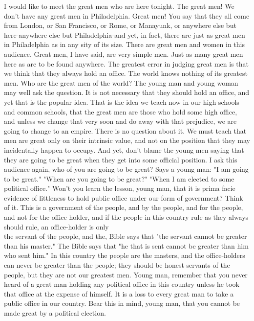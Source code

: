 \documentclass[10pt]{article}
\begin{document}
I would like to meet the great men who are here tonight. The great men! We don't have any great men in Philadelphia. Great men! You say that they all come from London, or San Francisco, or Rome, or Manayunk, or anywhere else but here-anywhere else but Philadelphia-and yet, in fact, there are just as great men in Philadelphia as in any sity of its size. There are great men and women in this audience. Great men, I have said, are very simple men. Just as many great men here as are to be found anywhere. The greatest error in judging great men is that we think that they always hold an office. The world knows nothing of its greatest men. Who are the great men of the world? The young man and young woman may well ask the question. It is not necessary that they should hold an office, and yet that is the popular idea. That is the idea we teach now in our high schools and common schools, that the great men are those who hold some high office, and unless we change that very soon and do away with that prejudice, we are going to change to an empire. There is no question about it. We must teach that men are great only on their intrinsic value, and not on the position that they may incidentally happen to occupy. And yet, don't blame the young men saying that they are going to be great when they get into some official position. I ask this audience again, who of you are going to be great? Says a young man: "I am going to be great." "When are you going to be great?" "When I am elected to some political office." Won't you learn the lesson, young man, that it is prima facie evidence of littleness to hold public office under our form of government? Think of it. This is a government of the people, and by the people, and for the people, and not for the office-holder, and if the people in this country rule as they always should rule, an office-holder is only\\
the servant of the people, and the, Bible says that "the servant cannot be greater than his master." The Bible says that "he that is sent cannot be greater than him who sent him." In this country the people are the masters, and the office-holders can never be greater than the people; they should be honest servants of the people, but they are not our greatest men. Young man, remember that you never heard of a great man holding any political office in this country unless he took that office at the expense of himself. It is a loss to every great man to take a public office in our country. Bear this in mind, young man, that you cannot be made great by a political election.
\end{document}
